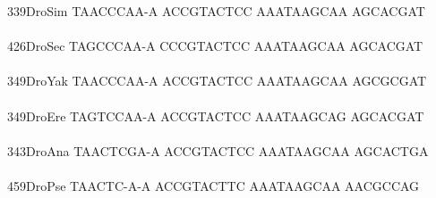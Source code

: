 \documentclass[11pt,twoside,reqno,a4paper]{article}
\begin{document}
{339\hspace*{1\charwidth}DroSim	TAACCCAA-A	ACCGTACTCC	AAATAAGCAA	AGCACGAT\\
\hspace*{4\charwidth}\hspace*{7\charwidth}\hspace*{1\charwidth}\hspace*{1\charwidth}\hspace*{1\charwidth}\\
426\hspace*{1\charwidth}DroSec	TAGCCCAA-A	CCCGTACTCC	AAATAAGCAA	AGCACGAT\\
\hspace*{4\charwidth}\hspace*{7\charwidth}\hspace*{1\charwidth}\hspace*{1\charwidth}\hspace*{1\charwidth}\\
349\hspace*{1\charwidth}DroYak	TAACCCAA-A	ACCGTACTCC	AAATAAGCAA	AGCGCGAT\\
\hspace*{4\charwidth}\hspace*{7\charwidth}\hspace*{1\charwidth}\hspace*{1\charwidth}\hspace*{1\charwidth}\\
349\hspace*{1\charwidth}DroEre	TAGTCCAA-A	ACCGTACTCC	AAATAAGCAG	AGCACGAT\\
\hspace*{4\charwidth}\hspace*{7\charwidth}\hspace*{1\charwidth}\hspace*{1\charwidth}\hspace*{1\charwidth}\\
343\hspace*{1\charwidth}DroAna	TAACTCGA-A	ACCGTACTCC	AAATAAGCAA	AGCACTGA\\
\hspace*{4\charwidth}\hspace*{7\charwidth}\hspace*{1\charwidth}\hspace*{1\charwidth}\hspace*{1\charwidth}\\
459\hspace*{1\charwidth}DroPse	TAACTC-A-A	ACCGTACTTC	AAATAAGCAA	AACGCCAG\\
}
\end{document}
